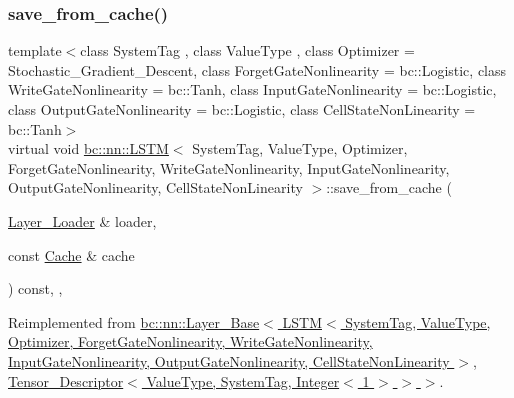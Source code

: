 \subsubsection{\texorpdfstring{save\+\_\+from\+\_\+cache()}{save\_from\_cache()}}
{\footnotesize\ttfamily template$<$class System\+Tag , class Value\+Type , class Optimizer  = Stochastic\+\_\+\+Gradient\+\_\+\+Descent, class Forget\+Gate\+Nonlinearity  = bc\+::\+Logistic, class Write\+Gate\+Nonlinearity  = bc\+::\+Tanh, class Input\+Gate\+Nonlinearity  = bc\+::\+Logistic, class Output\+Gate\+Nonlinearity  = bc\+::\+Logistic, class Cell\+State\+Non\+Linearity  = bc\+::\+Tanh$>$ \\
virtual void \hyperlink{structbc_1_1nn_1_1LSTM}{bc\+::nn\+::\+L\+S\+TM}$<$ System\+Tag, Value\+Type, Optimizer, Forget\+Gate\+Nonlinearity, Write\+Gate\+Nonlinearity, Input\+Gate\+Nonlinearity, Output\+Gate\+Nonlinearity, Cell\+State\+Non\+Linearity $>$\+::save\+\_\+from\+\_\+cache (\begin{DoxyParamCaption}\item[{\hyperlink{structbc_1_1nn_1_1Layer__Loader}{Layer\+\_\+\+Loader} \&}]{loader,  }\item[{const \hyperlink{structbc_1_1nn_1_1Cache}{Cache} \&}]{cache }\end{DoxyParamCaption}) const\hspace{0.3cm}{\ttfamily [inline]}, {\ttfamily [override]}, {\ttfamily [virtual]}}



Reimplemented from \hyperlink{structbc_1_1nn_1_1Layer__Base_a7bcba1c84802ca8410ba4156c9bac64a}{bc\+::nn\+::\+Layer\+\_\+\+Base$<$ L\+S\+T\+M$<$ System\+Tag, Value\+Type, Optimizer, Forget\+Gate\+Nonlinearity, Write\+Gate\+Nonlinearity, Input\+Gate\+Nonlinearity, Output\+Gate\+Nonlinearity, Cell\+State\+Non\+Linearity $>$, Tensor\+\_\+\+Descriptor$<$ Value\+Type, System\+Tag, Integer$<$ 1 $>$ $>$ $>$}.

\mbox{\label{structbc_1_1nn_1_1LSTM_af58d155c9bf27beb39b9898270515507}} 

